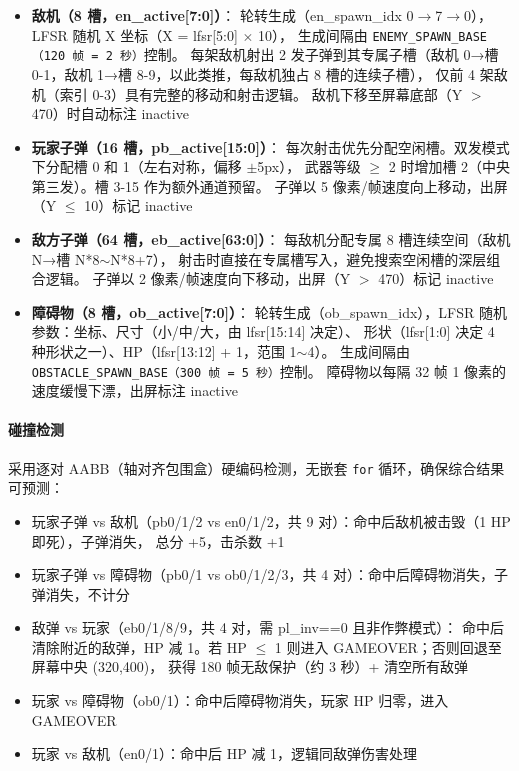 \documentclass[12pt,a4paper]{ctexart}
\begin{document}
\begin{itemize}
    \item \textbf{敌机（8 槽，en\_active[7:0]）}：
    轮转生成（en\_spawn\_idx 0$\rightarrow$7$\rightarrow$0），LFSR 随机 X 坐标（X = lfsr[5:0] $\times$ 10），
    生成间隔由 \texttt{ENEMY\_SPAWN\_BASE（120 帧 = 2 秒）}控制。
    每架敌机射出 2 发子弹到其专属子槽（敌机 0→槽 0-1，敌机 1→槽 8-9，以此类推，每敌机独占 8 槽的连续子槽），
    仅前 4 架敌机（索引 0-3）具有完整的移动和射击逻辑。
    敌机下移至屏幕底部（Y $>$ 470）时自动标注 inactive

    \item \textbf{玩家子弹（16 槽，pb\_active[15:0]）}：
    每次射击优先分配空闲槽。双发模式下分配槽 0 和 1（左右对称，偏移 $\pm$5px），
    武器等级 $\ge$ 2 时增加槽 2（中央第三发）。槽 3-15 作为额外通道预留。
    子弹以 5 像素/帧速度向上移动，出屏（Y $\le$ 10）标记 inactive

    \item \textbf{敌方子弹（64 槽，eb\_active[63:0]）}：
    每敌机分配专属 8 槽连续空间（敌机 N→槽 N*8$\sim$N*8+7），
    射击时直接在专属槽写入，避免搜索空闲槽的深层组合逻辑。
    子弹以 2 像素/帧速度向下移动，出屏（Y $>$ 470）标记 inactive

    \item \textbf{障碍物（8 槽，ob\_active[7:0]）}：
    轮转生成（ob\_spawn\_idx），LFSR 随机参数：坐标、尺寸（小/中/大，由 lfsr[15:14] 决定）、
    形状（lfsr[1:0] 决定 4 种形状之一）、HP（lfsr[13:12] + 1，范围 1$\sim$4）。
    生成间隔由 \texttt{OBSTACLE\_SPAWN\_BASE（300 帧 = 5 秒）}控制。
    障碍物以每隔 32 帧 1 像素的速度缓慢下漂，出屏标注 inactive
\end{itemize}

\paragraph{碰撞检测}

采用逐对 AABB（轴对齐包围盒）硬编码检测，无嵌套 \texttt{for} 循环，确保综合结果可预测：

\begin{itemize}
    \item 玩家子弹 vs 敌机（pb0/1/2 vs en0/1/2，共 9 对）：命中后敌机被击毁（1 HP 即死），子弹消失，
    总分 +5，击杀数 +1
    \item 玩家子弹 vs 障碍物（pb0/1 vs ob0/1/2/3，共 4 对）：命中后障碍物消失，子弹消失，不计分
    \item 敌弹 vs 玩家（eb0/1/8/9，共 4 对，需 pl\_inv==0 且非作弊模式）：
    命中后清除附近的敌弹，HP 减 1。若 HP $\le$ 1 则进入 GAMEOVER；否则回退至屏幕中央 (320,400)，
    获得 180 帧无敌保护（约 3 秒）+ 清空所有敌弹
    \item 玩家 vs 障碍物（ob0/1）：命中后障碍物消失，玩家 HP 归零，进入 GAMEOVER
    \item 玩家 vs 敌机（en0/1）：命中后 HP 减 1，逻辑同敌弹伤害处理
\end{itemize}
\end{document}
